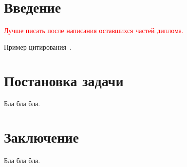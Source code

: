 \documentclass[oneside,senior,etd]{BYUPhys}
\newcommand{\todo}[1]{\textcolor{red}{#1}}
\begin{document}
\fixmargins
 \makepreliminarypages

\oneandhalfspace

\tableofcontents

\section{Введение}

\todo{Лучше писать после написания оставшихся частей диплома.}

Пример цитирования~\cite{tanenbaum2015, halperin08, heartbleed, vishnyakov18}.

\section{Постановка задачи}

Бла бла бла.

\section{Заключение}

Бла бла бла.

\raggedright



\end{document}

